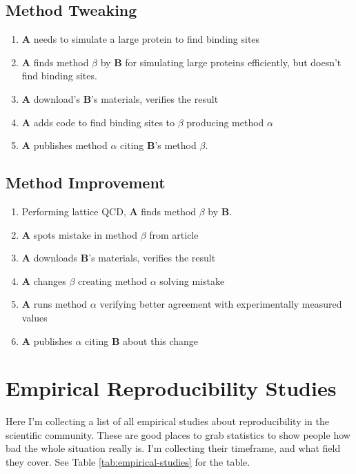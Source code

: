 \documentclass[american]{article}
\begin{document}
\subsection{Method Tweaking} \label{sec:goals-tweaking}

\begin{enumerate}
\item \textbf{A} needs to simulate a large protein to find binding sites
\item \textbf{A} finds method \boldmath$\beta$ by \textbf{B} for simulating large proteins efficiently, but doesn't find binding sites.
\item \textbf{A} download's \textbf{B}'s materials, verifies the result
\item \textbf{A} adds code to find binding sites to $\beta$ producing method $\alpha$
\item \textbf{A} publishes method $\alpha$ citing \textbf{B}'s method $\beta$.
\end{enumerate}

\subsection{Method Improvement} \label{sec:goals-improvement}

\begin{enumerate}
\item Performing lattice QCD, \textbf{A} finds method \boldmath$\beta$ by \textbf{B}.
\item \textbf{A} spots mistake in method $\beta$ from article
\item \textbf{A} downloads \textbf{B}'s materials, verifies the result
\item \textbf{A} changes $\beta$ creating method $\alpha$ solving mistake
\item \textbf{A} runs method $\alpha$ verifying better agreement with experimentally measured values
\item \textbf{A} publishes $\alpha$ citing \textbf{B} about this change
\end{enumerate}

\section{Empirical Reproducibility Studies} \label{sec:empirical}

Here I'm collecting a list of all empirical studies about reproducibility in the scientific community. These are good places to grab statistics to show people how bad the whole situation really is. I'm collecting their timeframe, and what field they cover. See Table \ref{tab:empirical-studies} for the table.
\end{document}

